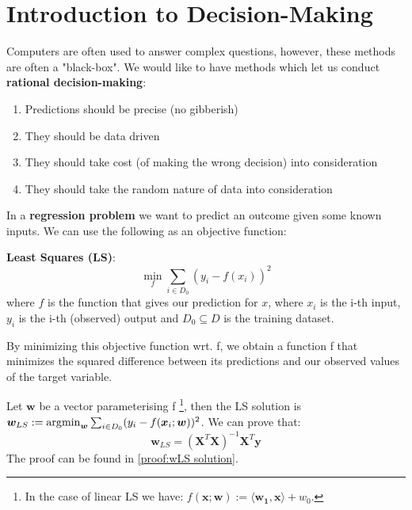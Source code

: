 \section{Introduction to Decision-Making}

Computers are often used to answer complex questions, however, these methods are often a "black-box". We would like to have methods which let us conduct \textbf{rational decision-making}:
\begin{enumerate}
    \item Predictions should be precise (no gibberish)
    \item They should be data driven
    \item They should take cost (of making the wrong decision) into consideration
    \item They should take the random nature of data into consideration
\end{enumerate}
In a \textbf{regression problem} we want to predict an outcome given some known inputs. We can use the following as an objective function:
\begin{definition}
    \textbf{Least Squares (LS)}: \\
    \begin{equation}
        \min_{f} \sum_{i \in D_{0}}  (y_{i} - f(x_{i}))  ^{2}
    \end{equation}
    where $f$ is the function that gives our prediction for $x$, where $x_{i}$ is the i-th input, $y_{i}$ is the i-th (observed) output and $D_{0} \subseteq D$ is the training dataset.
\end{definition}
By minimizing this objective function wrt. f, we obtain a function f that minimizes the squared difference between its predictions and our observed values of the target variable.

Let $\bm{w}$ be a vector parameterising f \footnote{In the case of linear LS we have: $f(\bm{x};\bm{w}) := \langle \bm{w_{1}} ,\bm{x} \rangle + w_{0}$.}, then the LS solution is $\bm{w}_{LS} := \operatorname*{arg\!\min}_{\bm{w}} \sum_{i \in D_{0}} (y_{i}-f(\bm{x}_{i}; \bm{w}))^{2}$. We can prove that:
\begin{equation}\label{eqn:wLS solution}
    \bm{w}_{LS} = (\bm{X}^{T} \bm{X})^{-1} \bm{X}^{T} \bm{y} 
\end{equation}
The proof can be found in \cref{proof:wLS solution}. 

